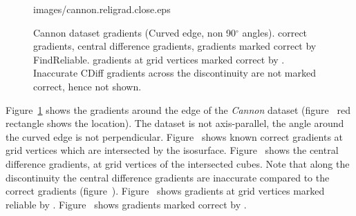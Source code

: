 \begin{figure}
{        {images/cannon.religrad.close.eps}\label{fig:cannon.religrad}}\vspace{-3mm}
    \caption{Cannon dataset gradients (Curved edge, non 90$^\circ$ angles). \protect{} correct gradients, \protect{} central difference gradients, \protect{} gradients marked correct by FindReliable. \protect{}  gradients at grid vertices marked correct by \protect\ReliGrad. Inaccurate CDiff gradients \protect{} across the discontinuity are not marked correct, hence not shown.}
    \label{fig:cannon:gradients}
\end{figure}


Figure~\ref{fig:cannon:gradients} shows the gradients around the edge of the \textit{Cannon} dataset (figure~ red rectangle shows the location). The dataset is not axis-parallel, the angle around the curved edge is not perpendicular. Figure~ shows known correct gradients at grid vertices which are intersected by the isosurface. Figure~ shows the central difference  gradients, at grid vertices of the intersected cubes. Note that along the discontinuity the central difference gradients are inaccurate compared to the correct gradients (figure~). Figure~ shows gradients at grid vertices marked reliable by \FindReliable. Figure~ shows gradients marked correct by \ReliGrad.
